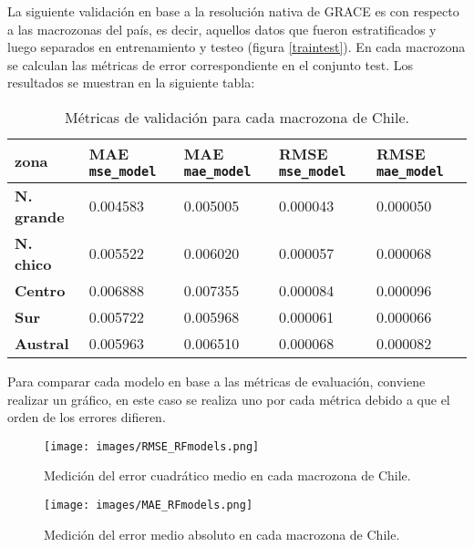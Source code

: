 La siguiente validación en base a la resolución nativa de GRACE es con respecto a las macrozonas del país, es decir, aquellos datos que fueron estratificados y luego separados en entrenamiento y testeo (figura \ref{traintest}).
En cada macrozona se calculan las métricas de error correspondiente en el conjunto test. Los resultados se muestran en la siguiente tabla:

    \begin{table}[H] 
        \caption[Métricas de validación para cada macrozona]{Métricas de validación para cada macrozona de Chile.}
        \begin{tabularx}{0.9\textwidth}{CCCCC}
        \toprule
        \textbf{zona}	& \textbf{MAE \texttt{mse\_model}}	& \textbf{MAE \texttt{mae\_model}} & \textbf{RMSE \texttt{mse\_model}} & \textbf{RMSE \texttt{mae\_model}}\\
            \midrule
            \textbf{N. grande}		& 0.004583 & 0.005005 & 0.000043 & 0.000050\\
            \textbf{N. chico}		    & 0.005522 & 0.006020 & 0.000057 & 0.000068\\
            \textbf{Centro}             & 0.006888 & 0.007355 & 0.000084 & 0.000096\\
            \textbf{Sur}                 & 0.005722 & 0.005968 & 0.000061 & 0.000066\\
            \textbf{Austral}            & 0.005963 & 0.006510 & 0.000068 & 0.000082\\
            \bottomrule
        \end{tabularx}
    \end{table}

Para comparar cada modelo en base a las métricas de evaluación, conviene realizar un gráfico, en este caso se realiza uno por cada métrica debido a que el orden de los errores
difieren. 

\begin{figure}[H]
    \centering
          \texttt{[image: images/RMSE\_RFmodels.png]}
          \vskip -0.1in
    \caption[Error cuadrático medio en cada macrozona del país]{\footnotesize Medición del error cuadrático medio en cada macrozona de Chile.}
    \label{mserf}
\end{figure}

\begin{figure}[H]
    \centering
          \texttt{[image: images/MAE\_RFmodels.png]}
          \vskip -0.1in
    \caption[Error medio absoluto en cada macrozona del país]{\footnotesize Medición del error medio absoluto en cada macrozona de Chile.}
    \label{maerf}
\end{figure}

